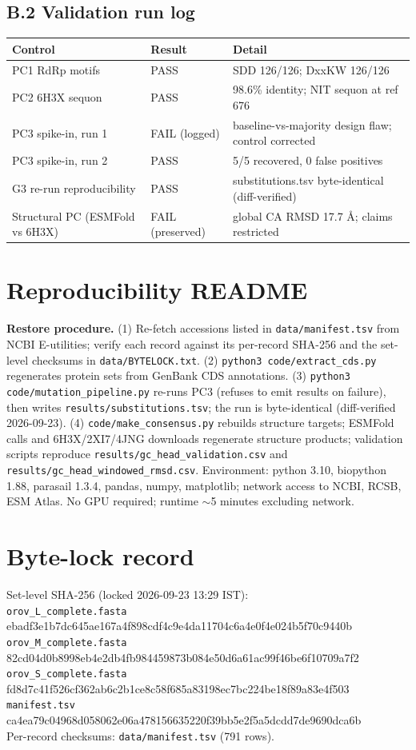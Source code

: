 \documentclass[12pt]{article}
\begin{document}
\subsection*{B.2 Validation run log}
\begin{center}\begin{tabular}{lll}
\hline
Control & Result & Detail \\
\hline
PC1 RdRp motifs & PASS & SDD 126/126; DxxKW 126/126 \\
PC2 6H3X sequon & PASS & 98.6\% identity; NIT sequon at ref 676 \\
PC3 spike-in, run 1 & FAIL (logged) & baseline-vs-majority design flaw; control corrected \\
PC3 spike-in, run 2 & PASS & 5/5 recovered, 0 false positives \\
G3 re-run reproducibility & PASS & substitutions.tsv byte-identical (diff-verified) \\
Structural PC (ESMFold vs 6H3X) & FAIL (preserved) & global CA RMSD 17.7 \AA{}; claims restricted \\
\hline
\end{tabular}\end{center}

\section{Reproducibility README}
\textbf{Restore procedure.} (1) Re-fetch accessions listed in \texttt{data/manifest.tsv} from NCBI E-utilities; verify each record against its per-record SHA-256 and the set-level checksums in \texttt{data/BYTELOCK.txt}. (2) \texttt{python3 code/extract\_cds.py} regenerates protein sets from GenBank CDS annotations. (3) \texttt{python3 code/mutation\_pipeline.py} re-runs PC3 (refuses to emit results on failure), then writes \texttt{results/substitutions.tsv}; the run is byte-identical (diff-verified 2026-09-23). (4) \texttt{code/make\_consensus.py} rebuilds structure targets; ESMFold calls and 6H3X/2XI7/4JNG downloads regenerate structure products; validation scripts reproduce \texttt{results/gc\_head\_validation.csv} and \texttt{results/gc\_head\_windowed\_rmsd.csv}. Environment: python 3.10, biopython 1.88, parasail 1.3.4, pandas, numpy, matplotlib; network access to NCBI, RCSB, ESM Atlas. No GPU required; runtime $\sim$5 minutes excluding network.

\section{Byte-lock record}
Set-level SHA-256 (locked 2026-09-23 13:29 IST):\\
\texttt{orov\_L\_complete.fasta} ebadf3e1b7dc645ae167a4f898cdf4c9e4da11704c6a4e0f4e024b5f70c9440b\\
\texttt{orov\_M\_complete.fasta} 82cd04d0b8998eb4e2db4fb984459873b084e50d6a61ac99f46be6f10709a7f2\\
\texttt{orov\_S\_complete.fasta} fd8d7c41f526cf362ab6c2b1ce8c58f685a83198ec7bc224be18f89a83e4f503\\
\texttt{manifest.tsv} ca4ea79c04968d058062e06a478156635220f39bb5e2f5a5dcdd7de9690dca6b\\
Per-record checksums: \texttt{data/manifest.tsv} (791 rows).
\end{document}

